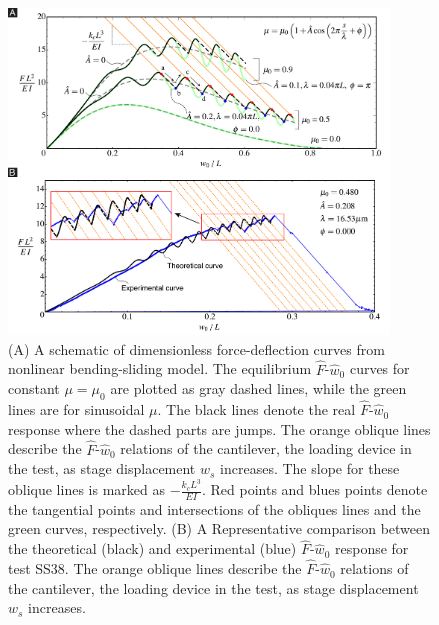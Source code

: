 \begin{figure}[H]
\centering
\includegraphics[width=0.9\textwidth]{Figures/Comparison.pdf}
\caption{
(\textsf{A}) A schematic of dimensionless force-deflection curves from nonlinear bending-sliding model. The equilibrium $\hat{F}$-$\hat{w}_0$ curves for constant $\mu = \mu_0$ are plotted as gray dashed lines, while the green lines are for sinusoidal $\mu$. The black lines denote the real $\hat{F}$-$\hat{w}_0$ response where the dashed parts are jumps. The orange oblique lines describe the $\hat{F}$-$\hat{w}_0$ relations of the cantilever, the loading device in the test, as stage displacement $w_s$ increases. The slope for these oblique lines is marked as $-\frac{k_c L^3}{E I}$. Red points and blues points denote the tangential points and intersections of the obliques lines and the green curves, respectively.
(\textsf{B}) A Representative comparison between the theoretical (black) and experimental (blue) $\hat{F}$-$\hat{w}_0$ response for test SS38. The orange oblique lines describe the $\hat{F}$-$\hat{w}_0$ relations of the cantilever, the loading device in the test, as stage displacement $w_s$ increases.
}
\label{fig:NBSComparison}
\end{figure}
